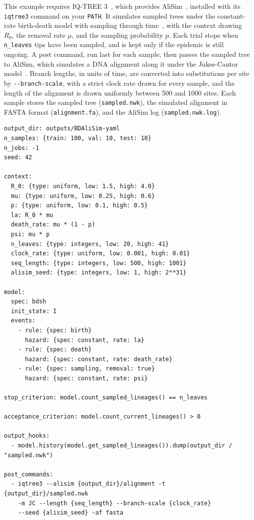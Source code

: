 \documentclass[11pt]{article}
\begin{document}
This example requires IQ-TREE 3~\citep{wong2026iqtree3}, which provides
AliSim~\citep{lytrong2022alisim}, installed with its \texttt{iqtree3} command on
your \texttt{PATH}. It simulates sampled trees under the constant-rate
birth-death model with sampling through time~\citep{stadler2010sampling}, with
the context drawing $R_0$, the removal rate $\mu$, and the sampling probability
$p$. Each trial stops when \texttt{n\_leaves} tips have been sampled, and is
kept only if the epidemic is still ongoing. A post command, run last for each
sample, then passes the sampled tree to AliSim, which simulates a DNA alignment
along it under the Jukes-Cantor model~\citep{jukes1969evolution}. Branch
lengths, in units of time, are converted into substitutions per site by
\texttt{-{}-branch-scale}, with a strict clock rate drawn for every sample, and
the length of the alignment is drawn uniformly between 500 and 1000 sites. Each
sample stores the sampled tree (\texttt{sampled.nwk}), the simulated alignment
in FASTA format (\texttt{alignment.fa}), and the AliSim log
(\texttt{sampled.nwk.log}).

\begin{lstlisting}[style=cfg]
output_dir: outputs/BDAliSim-yaml
n_samples: {train: 100, val: 10, test: 10}
n_jobs: -1
seed: 42

context:
  R_0: {type: uniform, low: 1.5, high: 4.0}
  mu: {type: uniform, low: 0.25, high: 0.6}
  p: {type: uniform, low: 0.1, high: 0.5}
  la: R_0 * mu
  death_rate: mu * (1 - p)
  psi: mu * p
  n_leaves: {type: integers, low: 20, high: 41}
  clock_rate: {type: uniform, low: 0.001, high: 0.01}
  seq_length: {type: integers, low: 500, high: 1001}
  alisim_seed: {type: integers, low: 1, high: 2**31}

model:
  spec: bdsh
  init_state: I
  events:
    - rule: {spec: birth}
      hazard: {spec: constant, rate: la}
    - rule: {spec: death}
      hazard: {spec: constant, rate: death_rate}
    - rule: {spec: sampling, removal: true}
      hazard: {spec: constant, rate: psi}

stop_criterion: model.count_sampled_lineages() == n_leaves

acceptance_criterion: model.count_current_lineages() > 0

output_hooks:
  - model.history(model.get_sampled_lineages()).dump(output_dir / "sampled.nwk")

post_commands:
  - iqtree3 --alisim {output_dir}/alignment -t {output_dir}/sampled.nwk
    -m JC --length {seq_length} --branch-scale {clock_rate}
    --seed {alisim_seed} -af fasta
\end{lstlisting}
\end{document}
